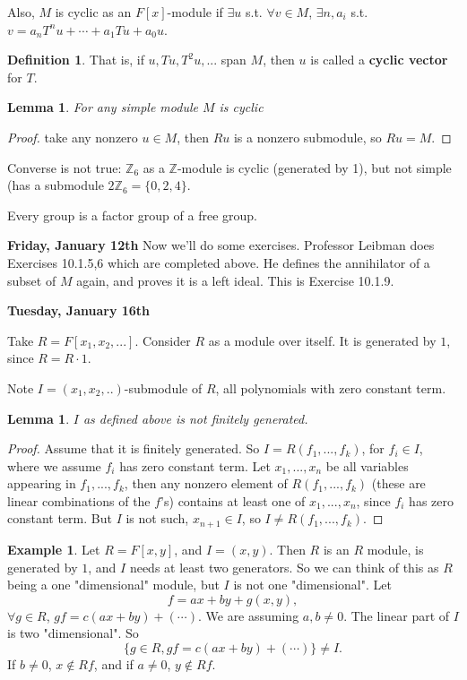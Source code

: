 \documentclass[12pt]{amsbook}
\theoremstyle{plain}
\numberwithin{section}{chapter}
\numberwithin{equation}{chapter}
\newtheorem{lem}[theorem]{Lemma}
\theoremstyle{definition}
\newtheorem{Def}[theorem]{Definition}
\newtheorem{Ex}[theorem]{Example}
\theoremstyle{remark}
\newcommand{\z}{\mathbb{Z}}
\begin{document}
Also, $M$ is cyclic as an $F[x]$-module if $\exists u$ s.t. $\forall v \in M$, $\exists n,a_i$ s.t. $v = a_nT^nu + \cdots + a_1Tu + a_0u$. 

\begin{Def}
That is, if $u,Tu,T^2u,...$ span $M$, then $u$ is called a \textbf{cyclic vector} for $T$. 
\end{Def}

\begin{lem}
For any simple module $M$ is cyclic
\end{lem}
\begin{proof}
 take any nonzero $u \in M$, then $Ru$ is a nonzero submodule, so $Ru = M$. 
\end{proof}

Converse is not true: $\z_6$ as a $\z$-module is cyclic (generated by 1), but not simple (has a submodule $2\z_6 = \{0,2,4\}$. 

Every group is a factor group of a free group. 

\vspace{3mm}
\textbf{Friday, January 12th}
Now we'll do some exercises. Professor Leibman does Exercises 10.1.5,6 which are completed above. He defines the annihilator of a subset of $M$ again, and proves it is a left ideal. This is Exercise 10.1.9. 

\textbf{Tuesday, January 16th}

Take $R = F[x_1,x_2,...]$. Consider $R$ as a module over itself. It is generated by $1$, since $R = R \cdot 1$. 

Note $I = (x_1,x_2,..)$-submodule of $R$, all polynomials with zero constant term. 

\begin{lem}
$I$ as defined above is not finitely generated. 
\end{lem}


\begin{proof}
Assume that it is finitely generated. So $I = R(f_1,...,f_k)$, for $f_i \in I$, where we assume $f_i$ has zero constant term.  Let $x_1,...,x_n$ be all variables appearing in $f_1,...,f_k$, then any nonzero element of $R(f_1,...,f_k)$ (these are linear combinations of the $f$'s) contains at least one of $x_1,...,x_n$, since $f_i$ has zero constant term. But $I$ is not such, $x_{n + 1} \in I$, so $I \neq R(f_1,...,f_k)$. 
\end{proof}

\begin{Ex}
Let $R = F[x,y]$, and $I = (x,y)$. Then $R$ is an $R$ module, is generated by $1$, and $I$ needs at least two generators. So we can think of this as $R$ being a one "dimensional" module, but $I$ is not one "dimensional". Let
$$
f = ax + by + g(x,y),
$$
$\forall g \in R$, $gf = c(ax + by) + (\cdots)$. We are assuming $a,b \neq 0$. The linear part of $I$ is two "dimensional". So
$$
\{g \in R, gf = c(ax + by) + (\cdots)\} \neq I. 
$$
If $b \neq 0$, $x \notin Rf$, and if $a \neq 0$, $y \notin Rf$. 
\end{Ex}
\end{document}
